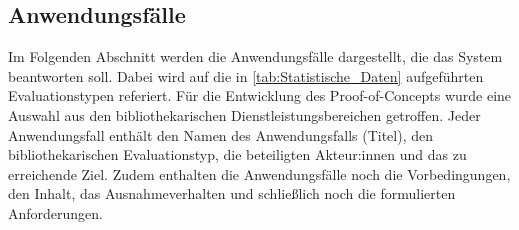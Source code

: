 


\subsection{Anwendungsfälle}
\label{chap:four_one_five}
Im Folgenden Abschnitt werden die Anwendungsfälle dargestellt, die das System beantworten soll. Dabei wird auf die in \autoref{tab:Statistische_Daten} aufgeführten
Evaluationstypen referiert. Für die Entwicklung des Proof-of-Concepts wurde eine Auswahl aus den bibliothekarischen Dienstleistungsbereichen getroffen. Jeder
Anwendungsfall enthält den Namen des Anwendungsfalls (Titel), den bibliothekarischen Evaluationstyp, die beteiligten Akteur:innen und das zu erreichende Ziel.
Zudem enthalten die Anwendungsfälle noch die Vorbedingungen, den Inhalt, das Ausnahmeverhalten und schließlich noch die formulierten Anforderungen.\\


